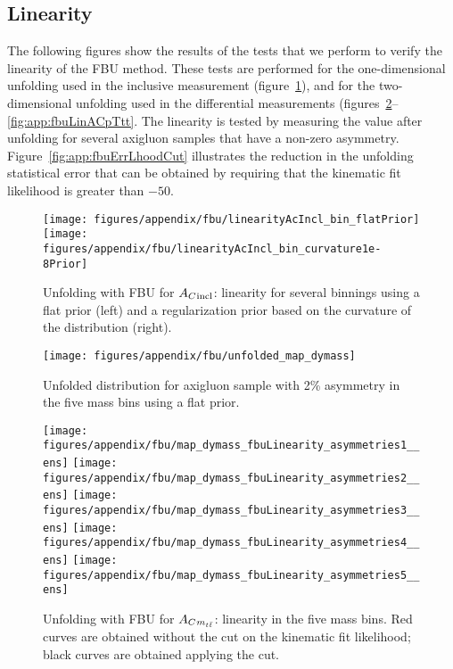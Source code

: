 \subsection{Linearity}
\label{sec:app:unfolding:linearity}
The following figures show the results of the tests that we perform to
verify the linearity of the FBU method.  These tests are performed for
the one-dimensional unfolding used in the inclusive measurement
(figure~\ref{fig:app:fbuLin}), and for the two-dimensional unfolding
used in the differential measurements
(figures~\ref{fig:app:fbuUnfACmtt}--\ref{fig:app:fbuLinACpTtt}.  The
linearity is tested by measuring the \ac{} value after unfolding for
several \protos{} axigluon samples that have a
non-zero asymmetry. Figure~\ref{fig:app:fbuErrLhoodCut} illustrates
the reduction in the unfolding statistical error that can be obtained
by requiring that the kinematic fit likelihood is greater than $-50$.
\begin{figure}\centering
  \texttt{[image: figures/appendix/fbu/linearityAcIncl\_bin\_flatPrior]}
  \texttt{[image: figures/appendix/fbu/linearityAcIncl\_bin\_curvature1e-8Prior]}
  \caption{
    \label{fig:app:fbuLin}
    Unfolding with FBU for $A_C{}_{\text{incl}}$: linearity for
    several \dy{} binnings using a flat prior (left) and a regularization prior 
    based on the curvature of the \dy{} distribution (right).
    }
\end{figure}
%
\begin{figure}
  \begin{center}
  \texttt{[image: figures/appendix/fbu/unfolded\_map\_dymass]}
  \caption{
    \label{fig:app:fbuUnfACmtt}
    Unfolded \dy{} distribution for axigluon sample with 2\% asymmetry
    in the five \ttbar{} mass bins using a flat prior.
    }
  \end{center}
\end{figure}
%
\begin{figure}
  \begin{center}
  \texttt{[image: figures/appendix/fbu/map\_dymass\_fbuLinearity\_asymmetries1\_\_ens]}
  \texttt{[image: figures/appendix/fbu/map\_dymass\_fbuLinearity\_asymmetries2\_\_ens]}
  \texttt{[image: figures/appendix/fbu/map\_dymass\_fbuLinearity\_asymmetries3\_\_ens]}
  \texttt{[image: figures/appendix/fbu/map\_dymass\_fbuLinearity\_asymmetries4\_\_ens]}
  \texttt{[image: figures/appendix/fbu/map\_dymass\_fbuLinearity\_asymmetries5\_\_ens]}
  \caption{
    \label{fig:app:fbuLinACmtt}
    Unfolding with FBU for $A_C{}_{m_{t\bar{t}}{}}$: linearity in the five
    \ttbar{} mass bins. Red curves are obtained
    without the cut on the kinematic fit likelihood; black curves are
    obtained applying the cut.
  }
  \end{center}
\end{figure}
